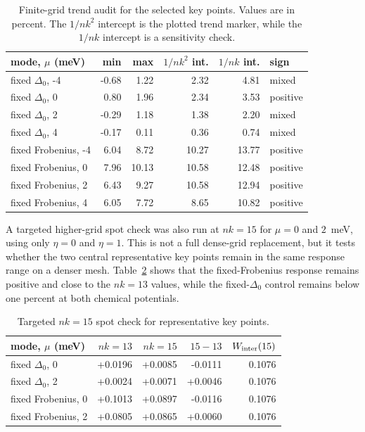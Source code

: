 \documentclass[aps,prb,preprint,superscriptaddress,floatfix,nofootinbib]{revtex4-2}
\begin{document}
\begin{table}[t]
\caption{Finite-grid trend audit for the selected key points.  Values are in
percent.  The $1/nk^2$ intercept is the plotted trend marker, while the $1/nk$
intercept is a sensitivity check.}
\label{tab:sm_nk_trend}
\begin{ruledtabular}
\begin{tabular}{lrrrrl}
mode, $\mu$ (meV) & min & max & $1/nk^2$ int. & $1/nk$ int. & sign\\
\hline
fixed $\Delta_0$, -4 & -0.68 &  1.22 &  2.32 &  4.81 & mixed\\
fixed $\Delta_0$,  0 &  0.80 &  1.96 &  2.34 &  3.53 & positive\\
fixed $\Delta_0$,  2 & -0.29 &  1.18 &  1.38 &  2.20 & mixed\\
fixed $\Delta_0$,  4 & -0.17 &  0.11 &  0.36 &  0.74 & mixed\\
fixed Frobenius, -4 &  6.04 &  8.72 & 10.27 & 13.77 & positive\\
fixed Frobenius,  0 &  7.96 & 10.13 & 10.58 & 12.48 & positive\\
fixed Frobenius,  2 &  6.43 &  9.27 & 10.58 & 12.94 & positive\\
fixed Frobenius,  4 &  6.05 &  7.72 &  8.65 & 10.82 & positive\\
\end{tabular}
\end{ruledtabular}
\end{table}

A targeted higher-grid spot check was also run at $nk=15$ for $\mu=0$ and
$2$~meV, using only $\eta=0$ and $\eta=1$.  This is not a full dense-grid
replacement, but it tests whether the two central representative key points
remain in the same response range on a denser mesh.  Table~\ref{tab:sm_nk15}
shows that the fixed-Frobenius response remains positive and close to the
$nk=13$ values, while the fixed-$\Delta_0$ control remains below one percent at
both chemical potentials.

\begin{table}[t]
\caption{Targeted $nk=15$ spot check for representative key points.}
\label{tab:sm_nk15}
\begin{ruledtabular}
\begin{tabular}{lrrrr}
mode, $\mu$ (meV) & $nk=13$ & $nk=15$ & $15-13$ & $W_{\rm inter}(15)$\\
\hline
fixed $\Delta_0$, 0 & +0.0196 & +0.0085 & -0.0111 & 0.1076\\
fixed $\Delta_0$, 2 & +0.0024 & +0.0071 & +0.0046 & 0.1076\\
fixed Frobenius, 0 & +0.1013 & +0.0897 & -0.0116 & 0.1076\\
fixed Frobenius, 2 & +0.0805 & +0.0865 & +0.0060 & 0.1076\\
\end{tabular}
\end{ruledtabular}
\end{table}
\end{document}

